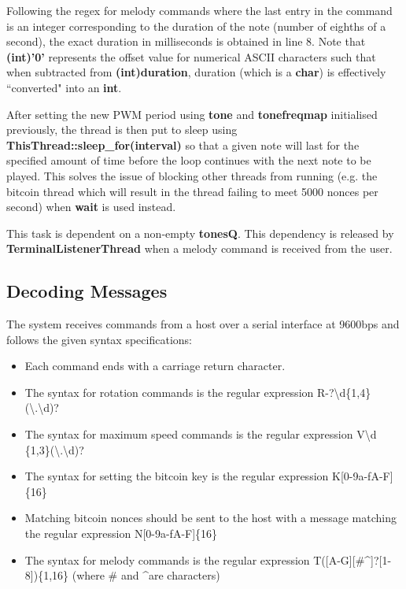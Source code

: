 \documentclass{article}
\begin{document}
\bigskip

\noindent
Following the regex for melody commands where the last entry in the command is an integer corresponding to the duration of the note (number of eighths of a second), the exact duration in milliseconds is obtained in line 8. Note that \textbf{(int)'0'} represents the offset value for numerical ASCII characters such that when subtracted from \textbf{(int)duration}, duration (which is a \textbf{char}) is effectively ``converted" into an \textbf{int}.

\bigskip

\noindent
After setting the new PWM period using \textbf{tone} and \textbf{tonefreqmap} initialised previously, the thread is then put to sleep using \textbf{ThisThread::sleep\_for(interval)} so that a given note will last for the specified amount of time before the loop continues with the next note to be played. This solves the issue of blocking other threads from running (e.g. the bitcoin thread which will result in the thread failing to meet 5000 nonces per second) when \textbf{wait} is used instead.

\bigskip

\noindent
This task is dependent on a non-empty \textbf{tonesQ}. This dependency is released by \textbf{TerminalListenerThread} when a melody command is received from the user.

\subsection{Decoding Messages}

\noindent The system receives commands from a host over a serial interface at 9600bps and follows the given syntax specifications:

 \begin{itemize}
	\item Each command ends with a carriage return character.
	\item The syntax for rotation commands is the regular expression R-?\textbackslash{}d\{1,4\}(\textbackslash{}.\textbackslash{}d)?
	\item The syntax for maximum speed commands is the regular expression V\textbackslash d \{1,3\}(\textbackslash{}.\textbackslash{}d)?
	\item The syntax for setting the bitcoin key is the regular expression K[0-9a-fA-F]\{16\}
	\item Matching bitcoin nonces should be sent to the host with a message matching the regular expression N[0-9a-fA-F]\{16\}
	\item The syntax for melody commands is the regular expression T([A-G][\#\textasciicircum{}]?[1-8])\{1,16\} (where \# and \textasciicircum{}are characters)

\end{itemize}
\end{document}
